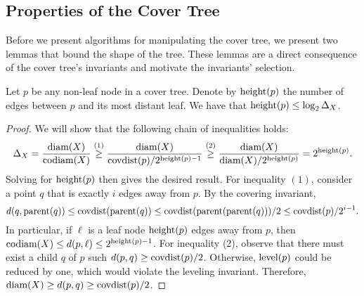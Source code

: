 \documentclass[thesis.tex]{subfiles}
\newcommand{\dist}[2]{\distf({#1},{#2})}
\newcommand{\distf}{d}
\newcommand{\diam}[1]{\textnormal{diam}({#1})}
\newcommand{\codiam}[1]{\textnormal{codiam}({#1})}
\newcommand{\aspect}[1]{\Delta_{#1}}
\newcommand{\mkfunction}[1]{\ifmmode{\textnormal{{#1}}}}
\newcommand{\level}[1]      {\mkfunction{level}({#1})}
\newcommand{\parent}[1]     {\mkfunction{parent}({#1})}
\newcommand{\covdist}[1]    {\mkfunction{covdist}({#1})}
\newcommand{\maxdist}[1]    {\mkfunction{maxdist}({#1})}
\newcommand{\height}[1]     {\mkfunction{height}({#1})}
\begin{document}

\subsection{Properties of the Cover Tree}

Before we present algorithms for manipulating the cover tree, 
we present two lemmas that bound the shape of the tree.
These lemmas are a direct consequence of the cover tree's invariants and motivate the invariants' selection.


%


\begin{lemma}
    \label{lemma:height}
    Let $p$ be any non-leaf node in a cover tree.
    Denote by $\height{p}$ the number of edges between $p$ and its most distant leaf.
    We have that $\height{p} \le \log_2\aspect{X}$.
\end{lemma}

\begin{proof}
    We will show that the following chain of inequalities holds:
    \begin{equation}
        \aspect{X} 
        = \frac{\diam{X}}{\codiam{X}} 
        \overset{(1)}\ge \frac{\diam{X}}{\covdist{p}/2^{\height p-1}} 
        \overset{(2)}\ge \frac{\diam{X}}{\diam{X}/2^{\height p}} 
        = 2^{\height p}
        .
    \end{equation}
    Solving for $\height p$ then gives the desired result.
    For inequality $(1)$, consider a point $q$ that is exactly $i$ edges away from $p$.
    By the covering invariant, 
    \begin{equation}
        \dist{q}{\parent{q}} 
        \le 
        \covdist{\parent{q}}
        \le 
        \covdist{\parent{\parent{q}}}/2
        \le
        \covdist{p}/2^{i-1}
        .
    \end{equation}
    In particular, if $\ell$ is a leaf node $\height p$ edges away from $p$,
    then $\codiam{X}\le\dist{p}{\ell}\le2^{\height p-1}$.
    For inequality (2), observe that there must exist a child $q$ of $p$ such $\dist{p}{q} \ge \covdist{p}/2$.
    Otherwise, $\level p$ could be reduced by one, which would violate the leveling invariant.
    Therefore, $\diam{X} \ge \dist{p}{q} \ge \covdist{p}/2$.
\end{proof}
\end{document}
